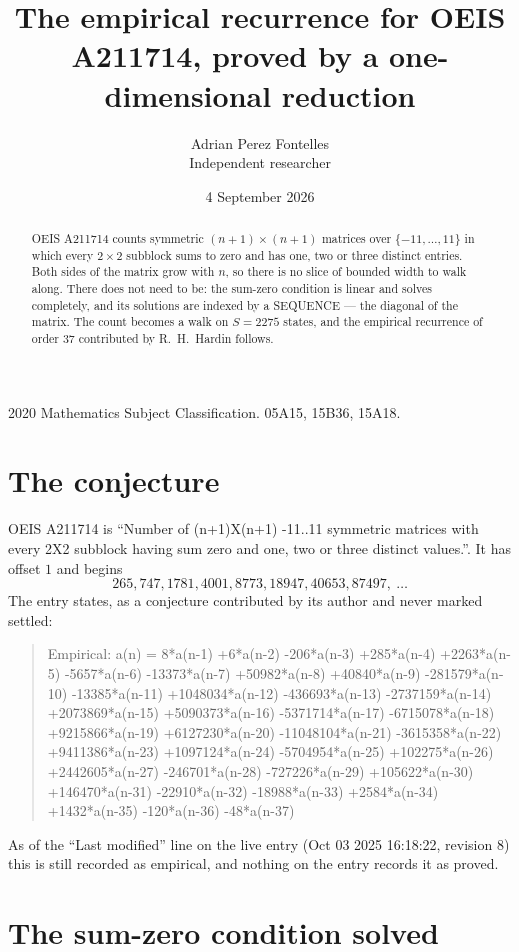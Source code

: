 \documentclass[11pt,a4paper]{article}
\title{The empirical recurrence for OEIS A211714, proved by a one-dimensional reduction}
\author{Adrian Perez Fontelles\\ \small Independent researcher}
\date{4 September 2026}
\theoremstyle{plain}
\theoremstyle{definition}
\begin{document}
\maketitle

\begin{abstract}
OEIS A211714 counts symmetric $(n+1)\times(n+1)$ matrices over
$\{-11,\dots,11\}$ in which every $2\times2$ subblock sums to zero and has one, two or three distinct
entries. Both sides of the matrix grow with $n$, so there is no slice of bounded width to walk
along. There does not need to be: the sum-zero condition is linear and solves completely, and
its solutions are indexed by a SEQUENCE --- the diagonal of the matrix. The count becomes a walk
on $S=2275$ states, and the empirical recurrence of order $37$ contributed by R.~H.~Hardin
follows.
\end{abstract}

\noindent\small 2020 Mathematics Subject Classification. 05A15, 15B36, 15A18.\normalsize

\section{The conjecture}

OEIS A211714 is ``Number of (n+1)X(n+1) -11..11 symmetric matrices with every 2X2 subblock having sum zero and one, two or three distinct values.''. It has offset $1$ and begins
\[
265, 747, 1781, 4001, 8773, 18947, 40653, 87497,\ \dots
\]
The entry states, as a conjecture contributed by its author and never marked settled:
\begin{quote}
Empirical: a(n) = 8*a(n-1) +6*a(n-2) -206*a(n-3) +285*a(n-4) +2263*a(n-5) -5657*a(n-6) -13373*a(n-7) +50982*a(n-8) +40840*a(n-9) -281579*a(n-10) -13385*a(n-11) +1048034*a(n-12) -436693*a(n-13) -2737159*a(n-14) +2073869*a(n-15) +5090373*a(n-16) -5371714*a(n-17) -6715078*a(n-18) +9215866*a(n-19) +6127230*a(n-20) -11048104*a(n-21) -3615358*a(n-22) +9411386*a(n-23) +1097124*a(n-24) -5704954*a(n-25) +102275*a(n-26) +2442605*a(n-27) -246701*a(n-28) -727226*a(n-29) +105622*a(n-30) +146470*a(n-31) -22910*a(n-32) -18988*a(n-33) +2584*a(n-34) +1432*a(n-35) -120*a(n-36) -48*a(n-37)
\end{quote}
As of the ``Last modified'' line on the live entry (Oct 03 2025 16:18:22, revision 8) this is still
recorded as empirical, and nothing on the entry records it as proved.

\section{The sum-zero condition solved}
\end{document}
